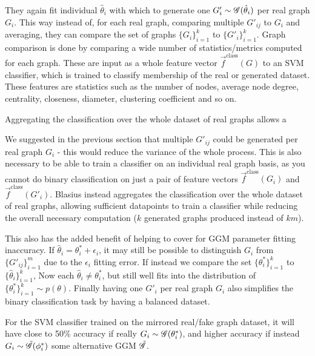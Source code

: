 They again fit individual $\hat{\theta}_i$ with which to generate one $G'_i \sim \mathscr{G}(\hat{\theta}_i)$ per real graph $G_i$. This way instead of, for each real graph, comparing multiple $G'_{ij}$ to $G_i$ and averaging, they can compare the set of graphs $\{G_i\}_{i=1}^k$ to $\{G'_i\}_{i=1}^k$. Graph comparison is done by comparing a wide number of statistics/metrics computed for each graph. These are input as a whole feature vector $\vec{f}^\mathrm{class}(G)$ to an SVM classifier, which is trained to classify membership of the real or generated dataset. These features are statistics such as the number of nodes, average node degree, centrality, closeness, diameter, clustering coefficient and so on.

Aggregating the classification over the whole dataset of real graphs allows a

We suggested in the previous section that multiple $G'_{ij}$ could be generated per real graph $G_i$ - this would reduce the variance of the whole process. This is also necessary to be able to train a classifier on an individual real graph basis, as you cannot do binary classification on just a pair of feature vectors $\vec{f}^\mathrm{class}(G_i)$ and $\vec{f}^\mathrm{class}(G'_i)$. Blasius instead aggregates the classification over the whole dataset of real graphs, allowing sufficient datapoints to train a classifier while reducing the overall necessary computation ($k$ generated graphs produced instead of $km$).

This also has the added benefit of helping to cover for GGM parameter fitting inaccuracy. If $\hat{\theta}_i = \theta^*_i + \epsilon_i$, it may still be possible to distinguish $G_i$ from $\{G'_{ij}\}_{i=1}^m$ due to the $\epsilon_i$ fitting error. If instead we compare the set $\{\theta^*_i\}_{i=1}^k$ to $\{\hat{\theta}_i\}_{i=1}^k$, Now each $\hat{\theta}_i \neq \theta^*_i$, but still well fits into the distribution of $\{\theta^*_i\}_{i=1}^k \sim p(\theta)$. Finally having one $G'_i$ per real graph $G_i$ also simplifies the binary classification task by having a balanced dataset.

For the SVM classifier trained on the mirrored real/fake graph dataset, it will have close to 50\% accuracy if really $G_i \sim \mathscr{G}(\theta^*_i)$, and higher accuracy if instead $G_i \sim \tilde{\mathscr{G}}(\phi^*_i)$ some alternative GGM $\tilde{\mathscr{G}}$.


